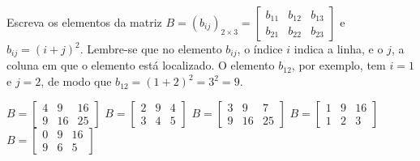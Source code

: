 Escreva os elementos da matriz $B = (b_{ij})_{2\times 3}=\left[ \begin{array}{ccc}
b_{11} & b_{12} & b_{13} \\
b_{21} & b_{22} & b_{23}
\end{array} \right]$ e $b_{ij}=(i+j)^2$. Lembre-se que no elemento $b_{ij}$, o índice $i$ indica a linha, e o $j$, a coluna em que o elemento está localizado. O elemento $b_{12}$, por exemplo, tem $i=1$ e $j=2$, de modo que $b_{12}=(1+2)^2=3^2=9$.

$B = \left[ \begin{array}{ccc} 4 & 9 & 16 \\9 & 16 & 25 \end{array} \right]$
$B = \left[ \begin{array}{ccc} 2 & 9 & 4 \\3 & 4 & 5 \end{array} \right]$
$B = \left[ \begin{array}{ccc} 3 & 9 & 7 \\9 & 16 & 25 \end{array} \right]$
$B = \left[ \begin{array}{ccc} 1 & 9 & 16 \\1 & 2 & 3 \end{array} \right]$
$B = \left[ \begin{array}{ccc} 0 & 9 & 16 \\9 & 6 & 5 \end{array} \right]$


